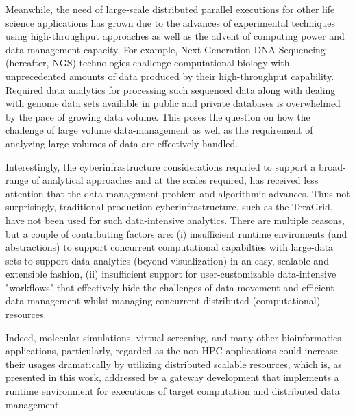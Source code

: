 \documentclass{sig-alternate}
\begin{document}
Meanwhile, the need of large-scale distributed parallel executions for
other life science applications has grown due to the advances of
experimental techniques using high-throughput approaches as well as
the advent of computing power and data management capacity.  For
example, Next-Generation DNA Sequencing (hereafter, NGS) technologies
challenge computational biology with unprecedented amounts of data
produced by their high-throughput capability.  Required data analytics
for processing such sequenced data along with dealing with genome data
sets available in public and private databases is overwhelmed by the
pace of growing data volume.  This poses the question on how the
challenge of large volume data-management as well as the requirement
of analyzing large volumes of data are effectively handled.

Interestingly, the cyberinfrastructure considerations requried to
support a broad-range of analytical approaches and at the scales
required, has received less attention that the data-management problem
and algorithmic advances.  Thus not surprisingly, traditional
production cyberinfrastructure, such as the TeraGrid, have not been
used for such data-intensive analytics. There are multiple reasons,
but a couple of contributing factors are: (i) insufficient runtime
enviroments (and abstractions) to support concurrent computational
capabilties with large-data sets to support data-analytics (beyond
visualization) in an easy, scalable and extensible fashion, (ii)
insufficient support for user-customizable data-intensive "workflows"
that effectively hide the challenges of data-movement and efficient
data-management whilst managing concurrent distributed (computational)
resources.

Indeed, molecular simulations, virtual screening, and many other bioinformatics applications, particularly, regarded as the non-HPC applications could increase their usages dramatically by utilizing distributed scalable resources, which is, as presented in this work, addressed by a gateway development that implements a runtime environment for executions of target computation and distributed data management.
\end{document}
